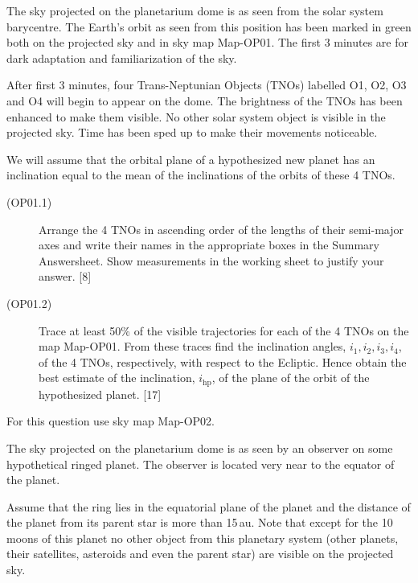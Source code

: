 The sky projected on the planetarium dome is as seen from the solar system
barycentre. The Earth's orbit as seen from this position has been marked in
green both on the projected sky and in sky map Map-OP01. The first 3 minutes
are for dark adaptation and familiarization of the sky.

After first 3 minutes, four Trans-Neptunian Objects (TNOs) labelled O1, O2,
O3 and O4 will begin to appear on the dome. The brightness of the TNOs has
been enhanced to make them visible. No other solar system object is visible
in the projected sky. Time has been sped up to make their movements
noticeable.

We will assume that the orbital plane of a hypothesized new planet has an
inclination equal to the mean of the inclinations of the orbits of these 4
TNOs.


\begin{description}
\item[(OP01.1)] Arrange the 4 TNOs in ascending order of the lengths of their
  semi-major axes and write their names in the appropriate boxes in the
  Summary Answersheet. Show measurements in the working sheet to justify your
  answer. \hfill[8]
\item[(OP01.2)] Trace at least 50\% of the visible trajectories for each of
  the 4 TNOs on the map Map-OP01. From these traces find the inclination
  angles, $i_1, i_2, i_3, i_4$, of the 4 TNOs, respectively, with respect to
  the Ecliptic. Hence obtain the best estimate of the inclination,
  $i_{\mathrm{hp}}$, of the plane of the orbit of the hypothesized planet.
  \hfill[17]
\end{description}

For this question use sky map Map-OP02.

The sky projected on the planetarium dome is as seen by an observer on some
hypothetical ringed planet. The observer is located very near to the equator
of the planet.

Assume that the ring lies in the equatorial plane of the planet and the
distance of the planet from its parent star is more than 15\,au. Note that
except for the 10 moons of this planet no other object from this planetary
system (other planets, their satellites, asteroids and even the parent star)
are visible on the projected sky.

